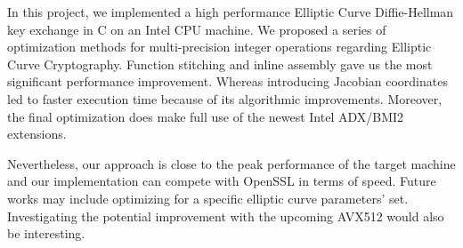 In this project, we implemented a high performance Elliptic Curve Diffie-Hellman key exchange in C on an Intel CPU machine. We proposed a series of optimization methods for multi-precision integer operations regarding Elliptic Curve Cryptography. Function stitching and inline assembly gave us the most significant performance improvement. Whereas introducing Jacobian coordinates led to faster execution time because of its algorithmic improvements. Moreover, the final optimization does make full use of the newest Intel ADX/BMI2 extensions.

Nevertheless, our approach is close to the peak performance of the target machine and our implementation can compete with OpenSSL in terms of speed. Future works may include optimizing for a specific elliptic curve parameters' set. Investigating the potential improvement with the upcoming AVX512 would also be interesting. 
